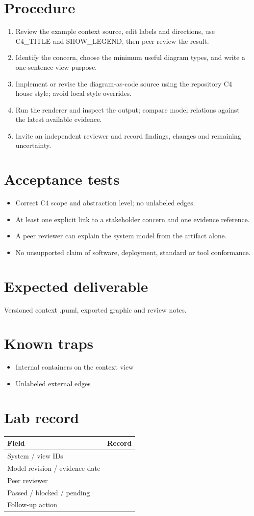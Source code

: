 \documentclass[10pt,letterpaper]{article}
\begin{document}
\section{Procedure}
\begin{enumerate}
\item Review the example context source, edit labels and directions, use C4\_TITLE and SHOW\_LEGEND, then peer-review the result.
\item Identify the concern, choose the minimum useful diagram types, and write a one-sentence view purpose.
\item Implement or revise the diagram-as-code source using the repository C4 house style; avoid local style overrides.
\item Run the renderer and inspect the output; compare model relations against the latest available evidence.
\item Invite an independent reviewer and record findings, changes and remaining uncertainty.
\end{enumerate}

\section{Acceptance tests}
\begin{itemize}
\item Correct C4 scope and abstraction level; no unlabeled edges.
\item At least one explicit link to a stakeholder concern and one evidence reference.
\item A peer reviewer can explain the system model from the artifact alone.
\item No unsupported claim of software, deployment, standard or tool conformance.
\end{itemize}

\section{Expected deliverable}
Versioned context .puml, exported graphic and review notes.


\section{Known traps}
\begin{itemize}
\item Internal containers on the context view
\item Unlabeled external edges
\end{itemize}

\section{Lab record}
\begin{tabularx}{\linewidth}{@{}YY@{}}\toprule
\textbf{Field} & \textbf{Record} \\ \midrule
System / view IDs &  \\
Model revision / evidence date &  \\
Peer reviewer &  \\
Passed / blocked / pending &  \\
Follow-up action &  \\
\bottomrule\end{tabularx}
\end{document}
